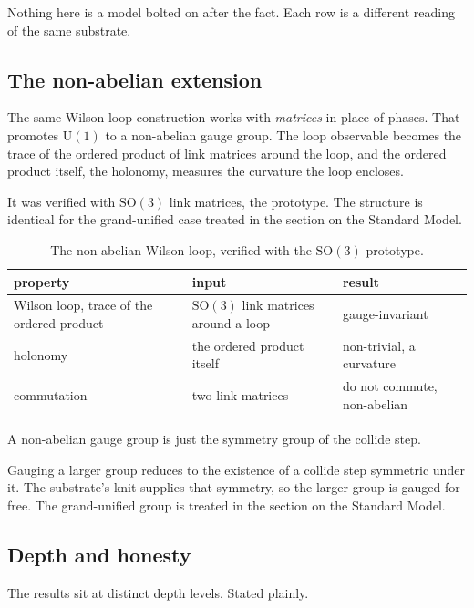 Nothing here is a model bolted on after the fact. Each row is a different reading of the same substrate.

\subsection{The non-abelian extension}

The same Wilson-loop construction works with \emph{matrices} in place of phases. That promotes $\mathrm{U}(1)$ to a non-abelian gauge group. The loop observable becomes the trace of the ordered product of link matrices around the loop, and the ordered product itself, the holonomy, measures the curvature the loop encloses.

It was verified with $\mathrm{SO}(3)$ link matrices, the prototype. The structure is identical for the grand-unified case treated in the section on the Standard Model.

\begin{table}[ht]
\centering
\begin{tabular}{@{}lll@{}}
\toprule
property & input & result \\
\midrule
Wilson loop, trace of the ordered product & $\mathrm{SO}(3)$ link matrices around a loop & gauge-invariant \\
holonomy & the ordered product itself & non-trivial, a curvature \\
commutation & two link matrices & do not commute, non-abelian \\
\bottomrule
\end{tabular}
\caption{The non-abelian Wilson loop, verified with the $\mathrm{SO}(3)$ prototype.}
\label{tab:em-nonabelian}
\end{table}

\begin{principle}
A non-abelian gauge group is just the symmetry group of the collide step.
\end{principle}

Gauging a larger group reduces to the existence of a collide step symmetric under it. The substrate's knit supplies that symmetry, so the larger group is gauged for free. The grand-unified group is treated in the section on the Standard Model.

\subsection{Depth and honesty}

The results sit at distinct depth levels. Stated plainly.


